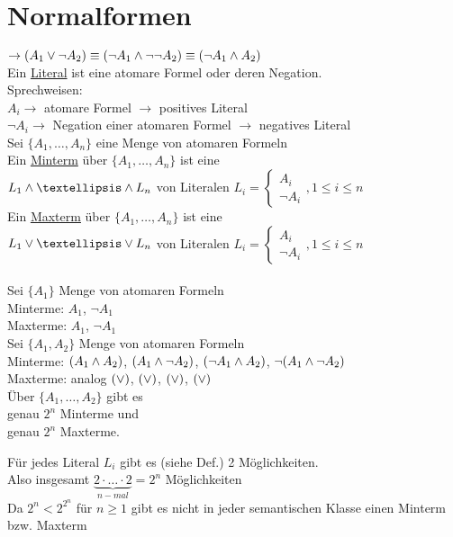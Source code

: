 \newpage

\section{Normalformen}

\beispiel{}
$\rightarrow (A_1 \vee \neg A_2 ) \equiv ( \neg A_1 \wedge \neg \neg A_2) \equiv ( \neg A_1 \wedge A_2)$\\

Ein \underline{Literal} ist eine atomare Formel oder deren Negation. \\

\noindent
Sprechweisen:\\
$A_i \rightarrow$ atomare Formel $\rightarrow$ positives Literal\\
$\neg A_i \rightarrow$ Negation einer atomaren Formel $\rightarrow$ negatives Literal\\

 Sei $\{A_1, …, A_n\}$ eine Menge von atomaren Formeln\\

\noindent
Ein \underline{Minterm} über $\{A_1, …, A_n\}$ ist eine  \\
$L_1 \AND … \AND L_n$ von Literalen $L_i = \begin{cases} A_i \\ \neg A_i \end{cases} , 1 \leq i \leq n$\\
Ein \underline{Maxterm} über $\{A_1, …, A_n\}$ ist eine \\
$L_1 \OR … \OR L_n$ von Literalen $L_i = \begin{cases} A_i \\ \neg A_i \end{cases} , 1 \leq i \leq n$\\

\beispiel{}\\
Sei $\{A_1\}$ Menge von atomaren Formeln\\
Minterme: $A_1$, $\neg A_1$\\
Maxterme: $A_1$, $\neg A_1$\\

\noindent
Sei $\{ A_1, A_2 \}$ Menge von atomaren Formeln\\
Minterme: $(A_1 \wedge A_2)$, $(A_1 \wedge \neg A_2)$, $(\neg A_1 \wedge A_2)$, $\neg ( A_1 \wedge \neg A_2)$\\
Maxterme: analog $( \vee )$, $( \vee )$, $( \vee )$, $( \vee )$\\

Über $\{A_1, …, A_2\}$ gibt es \\
genau $2^n$ Minterme und\\
genau $2^n$ Maxterme.

\beweis{}
Für jedes Literal $L_i$ gibt es (siehe Def.) 2 Möglichkeiten.\\
Also insgesamt $\underbrace{2 \cdot … \cdot 2}_{n-mal} = 2^n$ Möglichkeiten\\

\bemerkung{}
Da $2^n < 2^{2^n}$ für $n \geq 1$ gibt es nicht in jeder semantischen Klasse einen Minterm bzw. Maxterm


